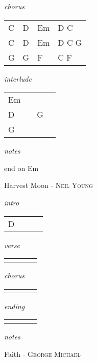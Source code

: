 \documentclass[12pt]{article}
\begin{document}
\textit{chorus}

\begin{tabular}{|P{1.25in}|P{1.25in}|P{1.25in}|P{1.25in}|}
  C & D  & Em  &  D C \\
  C & D  & Em  &  D C G \\
  G & G & F & C F \\
\end{tabular}

\textit{interlude}

\begin{tabular}{|P{1.25in}|P{1.25in}|P{1.25in}|P{1.25in}|}
  Em &   &   &   \\
  D &   & G  &   \\
  G &   &   &   \\
\end{tabular}

\textit{notes}

end on Em

\newpage


{\Huge Harvest Moon} {\huge - \textsc{Neil Young}}

\huge
\textit{intro}

\begin{tabular}{|P{1.25in}|P{1.25in}|P{1.25in}|P{1.25in}|}
  D &   &   &   \\
\end{tabular}

\textit{verse}

\begin{tabular}{|P{1.25in}|P{1.25in}|P{1.25in}|P{1.25in}|}
    &   &   &   \\
\end{tabular}

\textit{chorus}

\begin{tabular}{|P{1.25in}|P{1.25in}|P{1.25in}|P{1.25in}|}
    &   &   &   \\
\end{tabular}

\textit{ending}

\begin{tabular}{|P{1.25in}|P{1.25in}|P{1.25in}|P{1.25in}|}
    &   &   &   \\
\end{tabular}

\textit{notes}

\newpage
{\Huge Faith} {\huge - \textsc{George Michael}}
\end{document}
